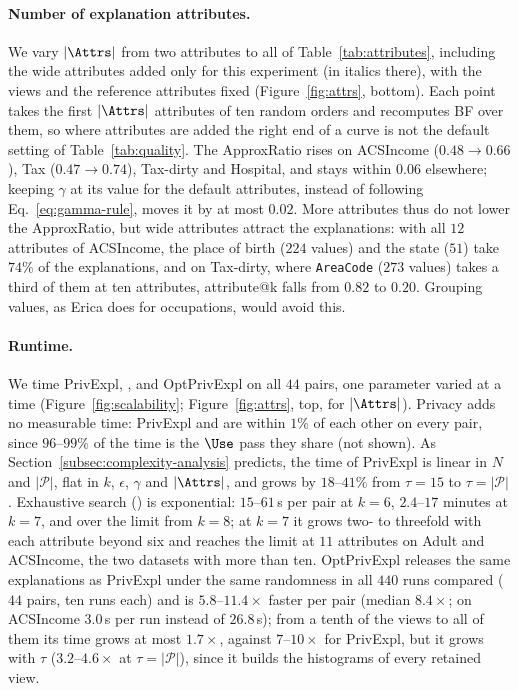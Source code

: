 \paragraph{Number of explanation attributes.}
\label{subsec:attrs}
We vary $|\Attrs|$ from two attributes to all of Table~\ref{tab:attributes}, including the wide attributes added only for this experiment (in italics there), with the views and the reference attributes fixed (Figure~\ref{fig:attrs}, bottom).
Each point takes the first $|\Attrs|$ attributes of ten random orders and recomputes \textsf{BF} over them, so where attributes are added the right end of a curve is not the default setting of Table~\ref{tab:quality}.
The ApproxRatio rises on ACSIncome ($0.48\rightarrow0.66$), Tax ($0.47\rightarrow0.74$), Tax-dirty and Hospital, and stays within $0.06$ elsewhere; keeping $\gamma$ at its value for the default attributes, instead of following Eq.~\eqref{eq:gamma-rule}, moves it by at most $0.02$.
More attributes thus do not lower the ApproxRatio, but wide attributes attract the explanations: with all $12$ attributes of ACSIncome, the place of birth ($224$ values) and the state ($51$) take $74\%$ of the explanations, and on Tax-dirty, where \texttt{AreaCode} ($273$ values) takes a third of them at ten attributes, attribute@k falls from $0.82$ to $0.20$.
Grouping values, as Erica does for occupations, would avoid this.

\paragraph{Runtime.}
\label{subsec:scalability}
We time \textsf{PrivExpl}, \Bone{}, \Btwo{} and \textsf{OptPrivExpl} on all $44$ pairs, one parameter varied at a time (Figure~\ref{fig:scalability}; Figure~\ref{fig:attrs}, top, for $|\Attrs|$).
Privacy adds no measurable time: \textsf{PrivExpl} and \Bone{} are within $1\%$ of each other on every pair, since $96$--$99\%$ of the time is the $\Use$ pass they share (not shown).
As Section~\ref{subsec:complexity-analysis} predicts, the time of \textsf{PrivExpl} is linear in $N$ and $|\mathcal{P}|$, flat in $k$, $\epsilon$, $\gamma$ and $|\Attrs|$, and grows by $18$--$41\%$ from $\tau=15$ to $\tau=|\mathcal{P}|$.
Exhaustive search (\Btwo{}) is exponential: $15$--$61$\,s per pair at $k=6$, $2.4$--$17$ minutes at $k=7$, and over the limit from $k=8$; at $k=7$ it grows two- to threefold with each attribute beyond six and reaches the limit at $11$ attributes on Adult and ACSIncome, the two datasets with more than ten.
\textsf{OptPrivExpl} releases the same explanations as \textsf{PrivExpl} under the same randomness in all $440$ runs compared ($44$ pairs, ten runs each) and is $5.8$--$11.4\times$ faster per pair (median $8.4\times$; on ACSIncome $3.0$\,s per run instead of $26.8$\,s); from a tenth of the views to all of them its time grows at most $1.7\times$, against $7$--$10\times$ for \textsf{PrivExpl}, but it grows with $\tau$ ($3.2$--$4.6\times$ at $\tau=|\mathcal{P}|$), since it builds the histograms of every retained view.
